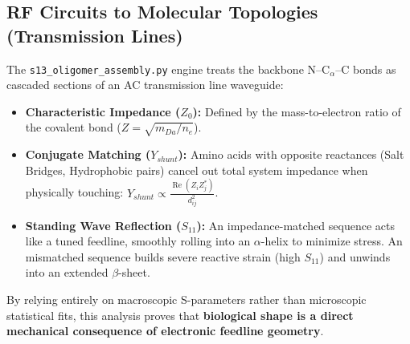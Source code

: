 \subsection{RF Circuits to Molecular Topologies (Transmission Lines)}
\label{sec:ee_rf_proteins}

The \texttt{s13\_oligomer\_assembly.py} engine treats the backbone N--C$_\alpha$--C bonds as cascaded sections of an AC transmission line waveguide:
\begin{itemize}
    \item \textbf{Characteristic Impedance ($Z_0$):} Defined by the mass-to-electron ratio of the covalent bond ($Z = \sqrt{m_{Da}/n_e}$).
    \item \textbf{Conjugate Matching ($Y_{shunt}$):} Amino acids with opposite reactances (Salt Bridges, Hydrophobic pairs) cancel out total system impedance when physically touching: $Y_{shunt} \propto \frac{\operatorname{Re}(Z_i Z_j^*)}{d_{ij}^2}$.
    \item \textbf{Standing Wave Reflection ($S_{11}$):} An impedance-matched sequence acts like a tuned feedline, smoothly rolling into an $\alpha$-helix to minimize stress. An mismatched sequence builds severe reactive strain (high $S_{11}$) and unwinds into an extended $\beta$-sheet.
\end{itemize}

By relying entirely on macroscopic S-parameters rather than microscopic statistical fits, this analysis proves that \textbf{biological shape is a direct mechanical consequence of electronic feedline geometry}.
